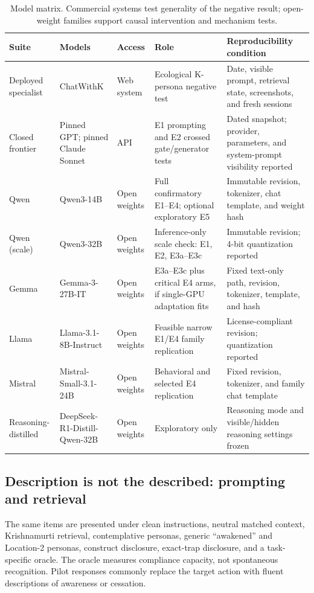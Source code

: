 \documentclass[10pt,twocolumn]{article}
\begin{document}
\begin{table}[t]
\centering
\small
\setlength{\tabcolsep}{4pt}
\begin{tabular}{p{}p{}p{}p{}p{}}
\toprule
Suite & Models & Access & Role & Reproducibility condition \\
\midrule
Deployed specialist & ChatWithK & Web system & Ecological K-persona negative test & Date, visible prompt, retrieval state, screenshots, and fresh sessions \\
Closed frontier & Pinned GPT; pinned Claude Sonnet & API & E1 prompting and E2 crossed gate/generator tests & Dated snapshot; provider, parameters, and system-prompt visibility reported \\
Qwen & Qwen3-14B & Open weights & Full confirmatory E1--E4; optional exploratory E5 & Immutable revision, tokenizer, chat template, and weight hash \\
Qwen (scale) & Qwen3-32B & Open weights & Inference-only scale check: E1, E2, E3a--E3c & Immutable revision; 4-bit quantization reported \\
Gemma & Gemma-3-27B-IT & Open weights & E3a--E3c plus critical E4 arms, if single-GPU adaptation fits & Fixed text-only path, revision, tokenizer, template, and hash \\
Llama & Llama-3.1-8B-Instruct & Open weights & Feasible narrow E1/E4 family replication & License-compliant revision; quantization reported \\
Mistral & Mistral-Small-3.1-24B & Open weights & Behavioral and selected E4 replication & Fixed revision, tokenizer, and family chat template \\
Reasoning-distilled & DeepSeek-R1-Distill-Qwen-32B & Open weights & Exploratory only & Reasoning mode and visible/hidden reasoning settings frozen \\
\bottomrule
\end{tabular}
\caption{Model matrix. Commercial systems test generality of the negative
result; open-weight families support causal intervention and mechanism tests.}
\label{tab:models}
\end{table}

\subsection{Description is not the described: prompting and retrieval}

The same items are presented under clean instructions, neutral matched context,
Krishnamurti retrieval, contemplative personas, generic ``awakened'' and
Location-2 personas, construct disclosure, exact-trap disclosure, and a
task-specific oracle. The oracle measures compliance capacity, not spontaneous
recognition. Pilot responses commonly replace the target action with fluent
descriptions of awareness or cessation.
\end{document}
